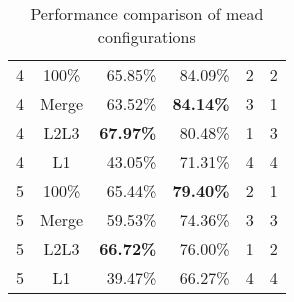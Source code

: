 \begin{table}[h]
\begin{tabular}{@{}ccrrcc@{}}
4       & 100\%                    & 65.85\%                    & 84.09\%                   & 2             & 2           \\
4       & Merge                    & 63.52\%                    & \textbf{84.14\%}          & 3             & 1           \\
4       & L2L3                     & \textbf{67.97\%}           & 80.48\%                   & 1             & 3           \\
4       & L1                       & 43.05\%                    & 71.31\%                   & 4             & 4           \\ \midrule
5       & 100\%                    & 65.44\%                    & \textbf{79.40\%}          & 2             & 1           \\
5       & Merge                    & 59.53\%                    & 74.36\%                   & 3             & 3           \\
5       & L2L3                     & \textbf{66.72\%}           & 76.00\%                   & 1             & 2           \\
5       & L1                       & 39.47\%                    & 66.27\%                   & 4             & 4           \\ \bottomrule
\end{tabular}
\caption[Performance comparison of MEADcast configurations]{Performance comparison of \gls{mead} configurations}
\label{tab:mead_cmp}
\end{table}

